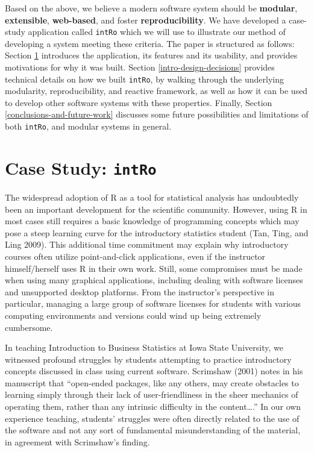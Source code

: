 \documentclass[12pt,]{article}
\begin{document}
Based on the above, we believe a modern software system should be
\textbf{modular}, \textbf{extensible}, \textbf{web-based}, and foster
\textbf{reproducibility}. We have developed a case-study application
called \texttt{intRo} which we will use to illustrate our method of
developing a system meeting these criteria. The paper is structured as
follows: Section \ref{case-study-intro} introduces the application, its
features and its usability, and provides motivations for why it was
built. Section \ref{intro-design-decisions} provides technical details
on how we built \texttt{intRo}, by walking through the underlying
modularity, reproducibility, and reactive framework, as well as how it
can be used to develop other software systems with these properties.
Finally, Section \ref{conclusions-and-future-work} discusses some future
possibilities and limitations of both \texttt{intRo}, and modular
systems in general.

\section{\texorpdfstring{Case Study:
\texttt{intRo}}{Case Study: intRo}}\label{case-study-intro}

The widespread adoption of R as a tool for statistical analysis has
undoubtedly been an important development for the scientific community.
However, using R in most cases still requires a basic knowledge of
programming concepts which may pose a steep learning curve for the
introductory statistics student (Tan, Ting, and Ling 2009). This
additional time commitment may explain why introductory courses often
utilize point-and-click applications, even if the instructor
himself/herself uses R in their own work. Still, some compromises must
be made when using many graphical applications, including dealing with
software licenses and unsupported desktop platforms. From the
instructor's perspective in particular, managing a large group of
software licenses for students with various computing environments and
versions could wind up being extremely cumbersome.

In teaching Introduction to Business Statistics at Iowa State
University, we witnessed profound struggles by students attempting to
practice introductory concepts discussed in class using current
software. Scrimshaw (2001) notes in his manuscript that ``open-ended
packages, like any others, may create obstacles to learning simply
through their lack of user-friendliness in the sheer mechanics of
operating them, rather than any intrinsic difficulty in the
content\ldots{}.'' In our own experience teaching, students' struggles
were often directly related to the use of the software and not any sort
of fundamental misunderstanding of the material, in agreement with
Scrimshaw's finding.
\end{document}
